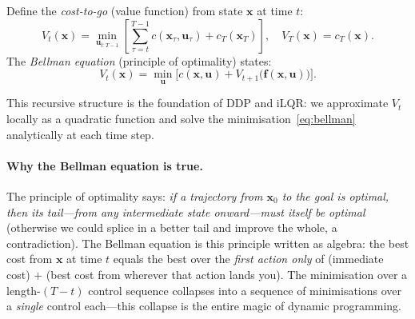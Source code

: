 \documentclass[11pt,twoside]{report}
\theoremstyle{definition}
\theoremstyle{plain}
\theoremstyle{remark}
\newcommand{\x}{\bm{x}}
\newcommand{\uu}{\bm{u}}
\newcommand{\f}{\bm{f}}
\newcommand{\0}{\bm{0}}
\begin{document}
Define the \emph{cost-to-go} (value function) from state $\x$ at time $t$:
\begin{equation}\label{eq:value-fn}
V_{t}(\x)=\min_{\uu_{t:T-1}}\left[\sum_{\tau=t}^{T-1}c(\x_{\tau},\uu_{\tau})+c_{T}(\x_{T})\right],
\quad V_{T}(\x)=c_{T}(\x).
\end{equation}
The \emph{Bellman equation} (principle of optimality) states:
\begin{equation}\label{eq:bellman}
\boxed{
V_{t}(\x)=\min_{\uu}\bigl[c(\x,\uu)+V_{t+1}\bigl(\f(\x,\uu)\bigr)\bigr].
}
\end{equation}

This recursive structure is the foundation of DDP and iLQR:
we approximate $V_{t}$ locally as a quadratic function and solve the
minimisation~\eqref{eq:bellman} analytically at each time step.

\paragraph{Why the Bellman equation is true.}
The principle of optimality says: \emph{if a trajectory from $\x_{0}$ to
the goal is optimal, then its tail---from any intermediate state
onward---must itself be optimal} (otherwise we could splice in a better
tail and improve the whole, a contradiction).
The Bellman equation is this principle written as algebra:
the best cost from $\x$ at time $t$ equals the best over the
\emph{first action only} of (immediate cost) $+$ (best cost from
wherever that action lands you). The minimisation over a length-$(T{-}t)$
control sequence collapses into a sequence of minimisations over a
\emph{single} control each---this collapse is the entire magic of
dynamic programming.
\end{document}
